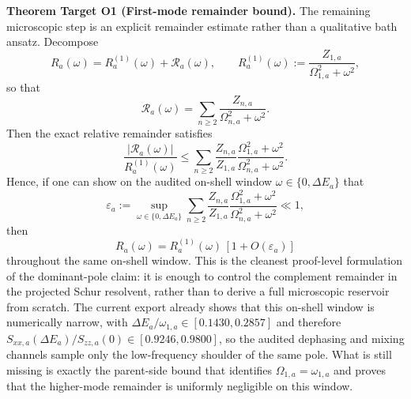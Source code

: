 \documentclass[aps,prd,onecolumn,notitlepage,nofootinbib,superscriptaddress,11pt,floatfix]{revtex4-2}
\begin{document}
\medskip\noindent\textbf{Theorem Target O1 (First-mode remainder bound).}
The remaining microscopic step is an explicit remainder estimate rather than a qualitative bath ansatz. Decompose
\[
R_a(\omega)=R^{(1)}_a(\omega)+\mathcal R_a(\omega),
\qquad
R^{(1)}_a(\omega):=\frac{Z_{1,a}}{\Omega_{1,a}^2+\omega^2},
\]
so that
\[
\mathcal R_a(\omega)=\sum_{n\ge2}\frac{Z_{n,a}}{\Omega_{n,a}^2+\omega^2}.
\]
Then the exact relative remainder satisfies
\[
\frac{|\mathcal R_a(\omega)|}{R^{(1)}_a(\omega)}
\le
\sum_{n\ge2}
\frac{Z_{n,a}}{Z_{1,a}}
\frac{\Omega_{1,a}^2+\omega^2}{\Omega_{n,a}^2+\omega^2}.
\]
Hence, if one can show on the audited on-shell window $\omega\in\{0,\Delta E_a\}$ that
\[
\varepsilon_a:=
\sup_{\omega\in\{0,\Delta E_a\}}
\sum_{n\ge2}
\frac{Z_{n,a}}{Z_{1,a}}
\frac{\Omega_{1,a}^2+\omega^2}{\Omega_{n,a}^2+\omega^2}
\ll 1,
\]
then
\[
R_a(\omega)=R^{(1)}_a(\omega)\,[1+O(\varepsilon_a)]
\]
throughout the same on-shell window. This is the cleanest proof-level formulation of the dominant-pole claim: it is enough to control the complement remainder in the projected Schur resolvent, rather than to derive a full microscopic reservoir from scratch. The current export already shows that this on-shell window is numerically narrow, with $\Delta E_a/\omega_{1,a}\in[0.1430,0.2857]$ and therefore $S_{xx,a}(\Delta E_a)/S_{zz,a}(0)\in[0.9246,0.9800]$, so the audited dephasing and mixing channels sample only the low-frequency shoulder of the same pole. What is still missing is exactly the parent-side bound that identifies $\Omega_{1,a}=\omega_{1,a}$ and proves that the higher-mode remainder is uniformly negligible on this window.
\end{document}
